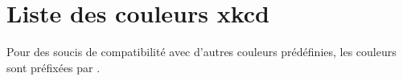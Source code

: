 \documentclass[french,11pt,a4paper]{article}
\begin{document}
%

\pagebreak

\section{Liste des couleurs xkcd}

Pour des soucis de compatibilité avec d'autres couleurs prédéfinies, les couleurs \MontreCode{[xkcd]} sont préfixées par .
\end{document}
